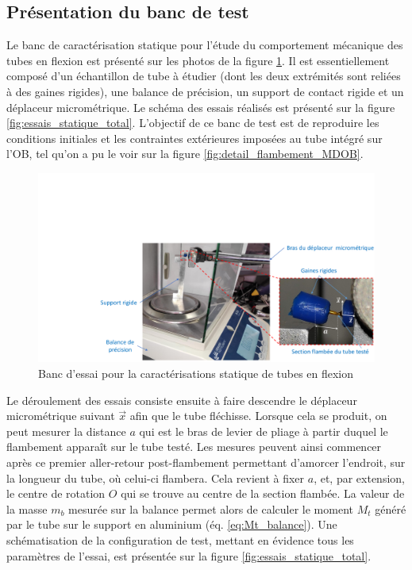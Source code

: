 	\subsection{Présentation du banc de test}
	\label{subsec:4.2.3_Présentation du banc de test}
Le banc de caractérisation statique pour l'étude du comportement mécanique des tubes en flexion est présenté sur les photos de la figure \ref{fig:BDT_statique_VH}. Il est essentiellement composé d'un échantillon de tube à étudier (dont les deux extrémités sont reliées à des gaines rigides), une balance de précision, un support de contact rigide et un déplaceur micrométrique. Le schéma des essais réalisés est présenté sur la figure \ref{fig:essais_statique_total}. L'objectif de ce banc de test est de reproduire les conditions initiales et les contraintes extérieures imposées au tube intégré sur l'OB, tel qu'on a pu le voir sur la figure \ref{fig:detail_flambement_MDOB}.
\begin{figure}[!htb]
	\begin{center}
		\captionsetup{justification=centering}
		\includegraphics[trim={6cm 0cm 0cm 7cm},clip,width=\textwidth]{../Chap4/Figure/BDT_statique_VH.pdf}
		\caption{Banc d'essai pour la caractérisations statique de tubes en flexion}
		\label{fig:BDT_statique_VH}
	\end{center}
\end{figure}   
Le déroulement des essais consiste ensuite à faire descendre le déplaceur micrométrique suivant $\vec{x}$ afin que le tube fléchisse. Lorsque cela se produit, on peut mesurer la distance $a$ qui est le bras de levier de pliage à partir duquel le flambement apparaît sur le tube testé. Les mesures peuvent ainsi commencer après ce premier aller-retour post-flambement permettant d'amorcer l'endroit, sur la longueur du tube, où celui-ci flambera. Cela revient à fixer $a$, et, par extension, le centre de rotation $O$ qui se trouve au centre de la section flambée. La valeur de la masse $m_b$ mesurée sur la balance permet alors de calculer le moment $M_t$ généré par le tube sur le support en aluminium (éq. \ref{eq:Mt_balance}). Une schématisation de la configuration de test, mettant en évidence tous les paramètres de l'essai, est présentée sur la figure \ref{fig:essais_statique_total}.
